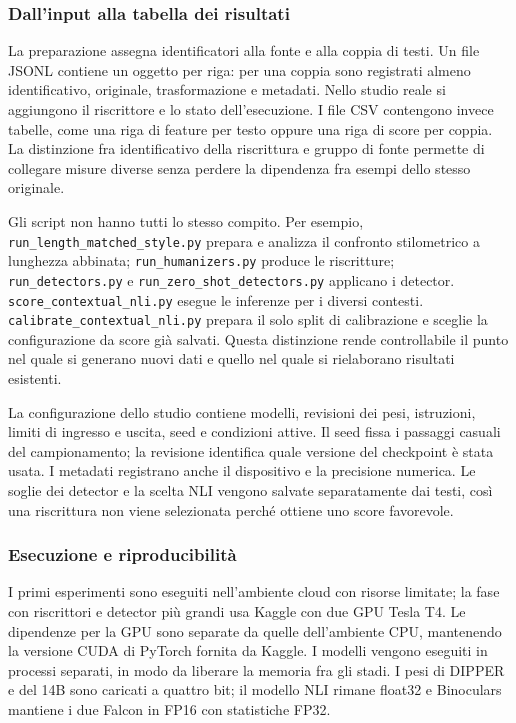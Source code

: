 \documentclass[11pt,a4paper]{article}
\begin{document}
\subsubsection{Dall'input alla tabella dei risultati}\label{dallinput-alla-tabella-dei-risultati}

La preparazione assegna identificatori alla fonte e alla coppia di testi. Un file JSONL contiene un oggetto per riga: per una coppia sono registrati almeno identificativo, originale, trasformazione e metadati. Nello studio reale si aggiungono il riscrittore e lo stato dell'esecuzione. I file CSV contengono invece tabelle, come una riga di feature per testo oppure una riga di score per coppia. La distinzione fra identificativo della riscrittura e gruppo di fonte permette di collegare misure diverse senza perdere la dipendenza fra esempi dello stesso originale.

Gli script non hanno tutti lo stesso compito. Per esempio, \nolinkurl{run_length_matched_style.py} prepara e analizza il confronto stilometrico a lunghezza abbinata; \nolinkurl{run_humanizers.py} produce le riscritture; \nolinkurl{run_detectors.py} e \nolinkurl{run_zero_shot_detectors.py} applicano i detector. \nolinkurl{score_contextual_nli.py} esegue le inferenze per i diversi contesti. \nolinkurl{calibrate_contextual_nli.py} prepara il solo split di calibrazione e sceglie la configurazione da score già salvati. Questa distinzione rende controllabile il punto nel quale si generano nuovi dati e quello nel quale si rielaborano risultati esistenti.

La configurazione dello studio contiene modelli, revisioni dei pesi, istruzioni, limiti di ingresso e uscita, seed e condizioni attive. Il seed fissa i passaggi casuali del campionamento; la revisione identifica quale versione del checkpoint è stata usata. I metadati registrano anche il dispositivo e la precisione numerica. Le soglie dei detector e la scelta NLI vengono salvate separatamente dai testi, così una riscrittura non viene selezionata perché ottiene uno score favorevole.

\subsubsection{Esecuzione e riproducibilità}\label{esecuzione-e-riproducibilituxe0}

I primi esperimenti sono eseguiti nell'ambiente cloud con risorse limitate; la fase con riscrittori e detector più grandi usa Kaggle con due GPU Tesla T4. Le dipendenze per la GPU sono separate da quelle dell'ambiente CPU, mantenendo la versione CUDA di PyTorch fornita da Kaggle. I modelli vengono eseguiti in processi separati, in modo da liberare la memoria fra gli stadi. I pesi di DIPPER e del 14B sono caricati a quattro bit; il modello NLI rimane float32 e Binoculars mantiene i due Falcon in FP16 con statistiche FP32.
\end{document}
